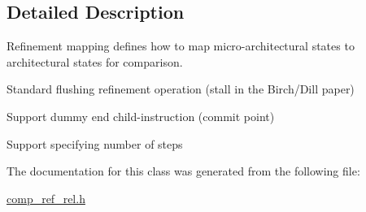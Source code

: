\subsection{Detailed Description}
Refinement mapping defines how to map micro-\/architectural states to architectural states for comparison. 


\begin{DoxyItemize}
\item Standard flushing refinement operation (stall in the Birch/\+Dill paper)
\item Support dummy end child-\/instruction (commit point)
\item Support specifying number of steps 
\end{DoxyItemize}

The documentation for this class was generated from the following file\+:\begin{DoxyCompactItemize}
\item 
\mbox{\hyperlink{comp__ref__rel_8h}{comp\+\_\+ref\+\_\+rel.\+h}}\end{DoxyCompactItemize}
